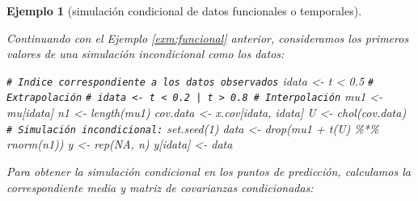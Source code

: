\documentclass[
  10pt,
]{book}
\newenvironment{Shaded}{\begin{snugshade}}{\end{snugshade}}
\newcommand{\CommentTok}[1]{\textcolor[rgb]{0.56,0.35,0.01}{\textit{#1}}}
\newcommand{\ConstantTok}[1]{\textcolor[rgb]{0.00,0.00,0.00}{#1}}
\newcommand{\DecValTok}[1]{\textcolor[rgb]{0.00,0.00,0.81}{#1}}
\newcommand{\FloatTok}[1]{\textcolor[rgb]{0.00,0.00,0.81}{#1}}
\newcommand{\FunctionTok}[1]{\textcolor[rgb]{0.00,0.00,0.00}{#1}}
\newcommand{\NormalTok}[1]{#1}
\newcommand{\OtherTok}[1]{\textcolor[rgb]{0.56,0.35,0.01}{#1}}
\newcommand{\SpecialCharTok}[1]{\textcolor[rgb]{0.00,0.00,0.00}{#1}}
\theoremstyle{break}
\newtheorem{example}{Ejemplo}[chapter]
\theoremstyle{nonumberplain}
\renewcommand{\CommentTok}[1]{\textcolor[rgb]{0.41,0.41,0.41}{\texttt{#1}}}
\begin{document}
\begin{example}[simulación condicional de datos funcionales o temporales]
\protect\hypertarget{exm:funcionalcond}{}\label{exm:funcionalcond}

Continuando con el Ejemplo \ref{exm:funcional} anterior, consideramos los primeros
valores de una simulación incondicional como los datos:

\begin{Shaded}
\begin{Highlighting}[]
\CommentTok{\# Indice correspondiente a los datos observados}
\NormalTok{idata }\OtherTok{\textless{}{-}}\NormalTok{ t }\SpecialCharTok{\textless{}} \FloatTok{0.5} \CommentTok{\# Extrapolación}
\CommentTok{\# idata \textless{}{-} t \textless{} 0.2 | t \textgreater{} 0.8 \# Interpolación}
\NormalTok{mu1 }\OtherTok{\textless{}{-}}\NormalTok{ mu[idata]}
\NormalTok{n1 }\OtherTok{\textless{}{-}} \FunctionTok{length}\NormalTok{(mu1)}
\NormalTok{cov.data }\OtherTok{\textless{}{-}}\NormalTok{ x.cov[idata, idata]}
\NormalTok{U }\OtherTok{\textless{}{-}} \FunctionTok{chol}\NormalTok{(cov.data)}
\CommentTok{\# Simulación incondicional:}
\FunctionTok{set.seed}\NormalTok{(}\DecValTok{1}\NormalTok{)}
\NormalTok{data }\OtherTok{\textless{}{-}} \FunctionTok{drop}\NormalTok{(mu1 }\SpecialCharTok{+} \FunctionTok{t}\NormalTok{(U) }\SpecialCharTok{\%*\%} \FunctionTok{rnorm}\NormalTok{(n1))}
\NormalTok{y }\OtherTok{\textless{}{-}} \FunctionTok{rep}\NormalTok{(}\ConstantTok{NA}\NormalTok{, n)}
\NormalTok{y[idata] }\OtherTok{\textless{}{-}}\NormalTok{ data}
\end{Highlighting}
\end{Shaded}

Para obtener la simulación condicional en los puntos de predicción, calculamos la correspondiente media y matriz de covarianzas condicionadas:


\end{example}
\end{document}
